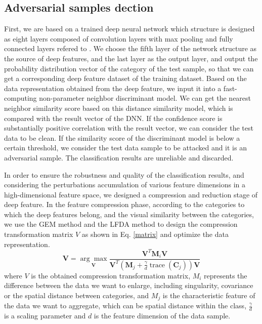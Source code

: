 \documentclass{ieeeaccess}
\begin{document}
\subsection{Adversarial samples dection}
First, we are based on a trained deep neural network which structure is designed as eight layers composed of convolution layers with max pooling and fully connected layers refered to \cite{sermanet2013overfeat}. 
We choose the fifth layer of the network structure as the source of deep features, and the last layer as the output layer, and output the probability distribution vector of the category of the test sample, so that we can get a corresponding deep feature dataset of the training dataset.
Based on the data representation obtained from the deep feature, we input it into a fast-computing non-parameter neighbor discriminant model. We can get the nearest neighbor similarity score based on this distance similarity model, which is compared with the result vector of the DNN. If the confidence score is substantially positive correlation with the result vector, we can consider the test data to be clean. If the similarity score of the discriminant model is below a certain threshold, we consider the test data sample to be attacked and it is an adversarial sample. The classification results are unreliable and discarded.

In order to ensure the robustness and quality of the classification results, and considering the perturbations accumulation of various feature dimensions in a high-dimensional feature space, we designed a compression and reduction stage of deep feature. In the feature compression phase, according to the categories to which the deep features belong, and the visual similarity between the categories, we use the GEM method and the LFDA method to design the compression transformation matrix $V$ as shown in Eq. \ref{matrix} and optimize the data representation.
\begin{equation}
\boldsymbol{V}=\underset{\boldsymbol{V}}{\arg \max } \frac{\boldsymbol{V}^{T} \boldsymbol{M}_{i} \boldsymbol{V}}{\boldsymbol{V}^{T}\left(\boldsymbol{M}_{j}+\frac{\gamma}{d} \operatorname{trace}\left(\boldsymbol{C}_{j}\right)\right) \boldsymbol{V}}
\label{matrix}
\end{equation}
where $V$ is the obtained compression transformation matrix, $M_i$ represents the difference between the data we want to enlarge, including singularity, covariance or the spatial distance between categories, and $M_j$ is the characteristic feature of the data we want to aggregate, which can be spatial distance within the class, $\frac{\gamma}{d}$ is a scaling parameter and $d$ is the feature dimension of the data sample.
\end{document}
